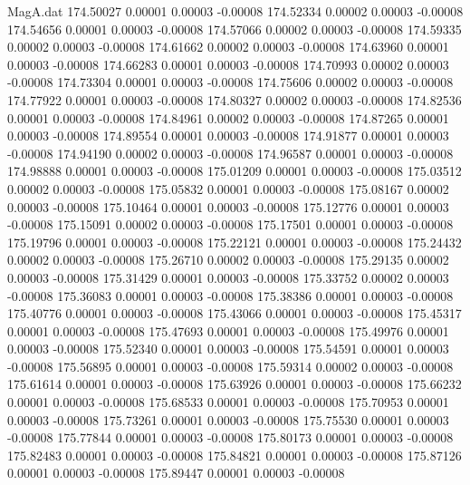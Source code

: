 \begin{filecontents}{MagA.dat}
 174.50027    0.00001    0.00003   -0.00008
 174.52334    0.00002    0.00003   -0.00008
 174.54656    0.00001    0.00003   -0.00008
 174.57066    0.00002    0.00003   -0.00008
 174.59335    0.00002    0.00003   -0.00008
 174.61662    0.00002    0.00003   -0.00008
 174.63960    0.00001    0.00003   -0.00008
 174.66283    0.00001    0.00003   -0.00008
 174.70993    0.00002    0.00003   -0.00008
 174.73304    0.00001    0.00003   -0.00008
 174.75606    0.00002    0.00003   -0.00008
 174.77922    0.00001    0.00003   -0.00008
 174.80327    0.00002    0.00003   -0.00008
 174.82536    0.00001    0.00003   -0.00008
 174.84961    0.00002    0.00003   -0.00008
 174.87265    0.00001    0.00003   -0.00008
 174.89554    0.00001    0.00003   -0.00008
 174.91877    0.00001    0.00003   -0.00008
 174.94190    0.00002    0.00003   -0.00008
 174.96587    0.00001    0.00003   -0.00008
 174.98888    0.00001    0.00003   -0.00008
 175.01209    0.00001    0.00003   -0.00008
 175.03512    0.00002    0.00003   -0.00008
 175.05832    0.00001    0.00003   -0.00008
 175.08167    0.00002    0.00003   -0.00008
 175.10464    0.00001    0.00003   -0.00008
 175.12776    0.00001    0.00003   -0.00008
 175.15091    0.00002    0.00003   -0.00008
 175.17501    0.00001    0.00003   -0.00008
 175.19796    0.00001    0.00003   -0.00008
 175.22121    0.00001    0.00003   -0.00008
 175.24432    0.00002    0.00003   -0.00008
 175.26710    0.00002    0.00003   -0.00008
 175.29135    0.00002    0.00003   -0.00008
 175.31429    0.00001    0.00003   -0.00008
 175.33752    0.00002    0.00003   -0.00008
 175.36083    0.00001    0.00003   -0.00008
 175.38386    0.00001    0.00003   -0.00008
 175.40776    0.00001    0.00003   -0.00008
 175.43066    0.00001    0.00003   -0.00008
 175.45317    0.00001    0.00003   -0.00008
 175.47693    0.00001    0.00003   -0.00008
 175.49976    0.00001    0.00003   -0.00008
 175.52340    0.00001    0.00003   -0.00008
 175.54591    0.00001    0.00003   -0.00008
 175.56895    0.00001    0.00003   -0.00008
 175.59314    0.00002    0.00003   -0.00008
 175.61614    0.00001    0.00003   -0.00008
 175.63926    0.00001    0.00003   -0.00008
 175.66232    0.00001    0.00003   -0.00008
 175.68533    0.00001    0.00003   -0.00008
 175.70953    0.00001    0.00003   -0.00008
 175.73261    0.00001    0.00003   -0.00008
 175.75530    0.00001    0.00003   -0.00008
 175.77844    0.00001    0.00003   -0.00008
 175.80173    0.00001    0.00003   -0.00008
 175.82483    0.00001    0.00003   -0.00008
 175.84821    0.00001    0.00003   -0.00008
 175.87126    0.00001    0.00003   -0.00008
 175.89447    0.00001    0.00003   -0.00008

\end{filecontents}
